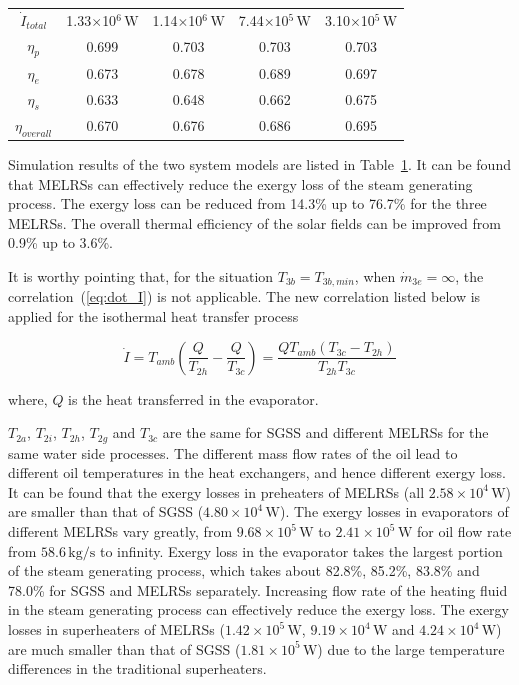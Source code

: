 \begin{table}[htbp]
\begin{center}
\begin{tabular}{ccccc}
		$\dot{I}_{total}$    &    1.33$\times$10$^6\,\mathrm{W}$    &  1.14$\times$10$^6\,\mathrm{W}$  &	7.44$\times$10$^5\,\mathrm{W}$	&	3.10$\times$10$^5\,\mathrm{W}$\\
		$\eta_p$    &    0.699    &	0.703	&    0.703	&	0.703\\
		$\eta_e$    &    0.673    &	0.678	& 0.689	&	0.697\\
		$\eta_s$    &    0.633    &  0.648	&  0.662	&	0.675\\
		$\eta_{overall}$    &    0.670   &	0.676	&    0.686	&	0.695\\
		\bottomrule
	\end{tabular}
	\end{center}
	\label{tab:comparison}
\end{table}

Simulation results of the two system models are listed in Table~\ref{tab:comparison}. It can be found that MELRSs can effectively reduce the exergy loss of the steam generating process. The exergy loss can be reduced from 14.3\% up to 76.7\% for the three MELRSs. The overall thermal efficiency of the solar fields can be improved from 0.9\% up to 3.6\%.

It is worthy pointing that, for the situation $T_{3b} = T_{3b,min}$, when $\dot{m}_{3e} = \infty$, the correlation~(\ref{eq:dot_I}) is not applicable. The new correlation listed below is applied for the isothermal heat transfer process

\begin{equation}
  \dot{I} = T_{amb} (\frac{Q}{T_{2h}} - \frac{Q}{T_{3c}}) = \frac{QT_{amb}(T_{3c} - T_{2h})}{T_{2h}T_{3c}}
  \label{eq:isothermal}
\end{equation}

where, $Q$ is the heat transferred in the evaporator.

$T_{2a}$, $T_{2i}$, $T_{2h}$, $T_{2g}$ and $T_{3c}$ are the same for SGSS and different MELRSs for the same water side processes. The different mass flow rates of the oil lead to different oil temperatures in the heat exchangers, and hence different exergy loss. It can be found that the exergy losses in preheaters of MELRSs (all $2.58\times 10^4\,\mathrm{W}$) are smaller than that of SGSS ($4.80\times10^4\,\mathrm{W}$). The exergy losses in evaporators of different MELRSs vary greatly, from $9.68\times10^5\,\mathrm{W}$ to $2.41\times10^5\,\mathrm{W}$ for oil flow rate from $58.6\,\mathrm{kg/s}$ to infinity.
Exergy loss in the evaporator takes the largest portion of the steam generating process, which takes about 82.8\%, 85.2\%, 83.8\% and 78.0\% for SGSS and MELRSs separately.
Increasing flow rate of the heating fluid in the steam generating process can effectively reduce the exergy loss.
The exergy losses in superheaters of MELRSs ($1.42\times 10^5\,\mathrm{W}$, $9.19\times 10^4\,\mathrm{W}$ and $4.24\times 10^4\,\mathrm{W}$) are much smaller than that of SGSS ($1.81\times10^5\,\mathrm{W}$) due to the large temperature differences in the traditional superheaters.

